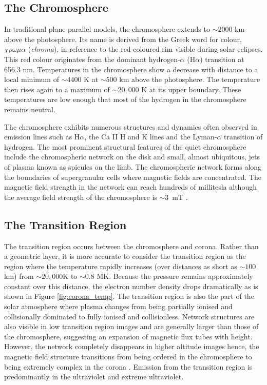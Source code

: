 \subsection{The Chromosphere}
In traditional plane-parallel models, the chromosphere extends to $\sim 2000$ km above the photosphere. Its name is derived from the Greek word for colour, $\chi \rho \omega \mu \alpha$ (\textit{chroma}), in reference to the red-coloured rim visible during solar eclipses. This red colour originates from the dominant hydrogen-$\alpha$ (H$\alpha$) transition at 656.3 nm. Temperatures in the chromosphere show a decrease with distance to a local minimum of $\sim 4400$ K at $\sim 500$ km above the photosphere. The temperature then rises again to a maximum of $\sim 20,000$ K at its upper boundary. These temperatures are low enough that most of the hydrogen in the chromosphere remains neutral. 

The chromosphere exhibits numerous structures and dynamics often observed in emission lines such as H$\alpha$, the Ca II H and K lines and the Lyman-$\alpha$ transition of hydrogen. The most prominent structural features of the quiet chromosphere include the chromospheric network on the disk and small, almost ubiquitous, jets of plasma known as spicules on the limb. The chromospheric network forms along the boundaries of supergranular cells where magnetic fields are concentrated. The magnetic field strength in the network can reach hundreds of millitesla although the average field strength of the chromosphere is $\sim 3$~mT \citep{McLean1985}.


\subsection{The Transition Region}
The transition region occurs between the chromosphere and corona. Rather than a geometric layer, it is more accurate to consider the transition region as the region where the temperature rapidly increases (over distances as short as $\sim 100$ km) from $\sim 20,000$K to $\sim 0.8$ MK. Because the pressure remains approximately constant over this distance, the electron number density drops dramatically as is shown in Figure \ref{fig:corona_temp}. The transition region is also the part of the solar atmosphere where plasma changes from being partially ionised and collisionally dominated to fully ionised and collisionless. Network structures are also visible in low transition region images and are generally larger than those of the chromosphere, suggesting an expansion of magnetic flux tubes with height. However, the network completely disappears in higher altitude images hence, the magnetic field structure transitions from being ordered in the chromosphere to being extremely complex in the corona \citep{Tian2017}. Emission from the transition region is predominantly in the ultraviolet and extreme ultraviolet.

